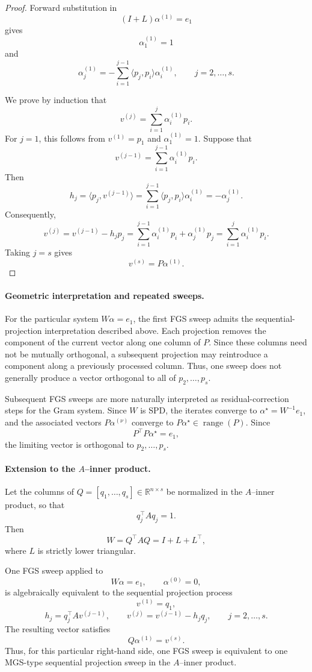 \documentclass[pdflatex,sn-mathphys-num]{sn-jnl}%
\begin{document}
\begin{proof}
Forward substitution in
\[
(I+L)\alpha^{(1)}=e_1
\]
gives
\[
\alpha_1^{(1)}=1
\]
and
\[
\alpha_j^{(1)}
=
-\sum_{i=1}^{j-1}
\langle p_j,p_i\rangle\alpha_i^{(1)},
\qquad
j=2,\dots,s.
\]

We prove by induction that
\[
v^{(j)}
=
\sum_{i=1}^{j}
\alpha_i^{(1)}p_i.
\]
For $j=1$, this follows from
$v^{(1)}=p_1$ and $\alpha_1^{(1)}=1$. Suppose that
\[
v^{(j-1)}
=
\sum_{i=1}^{j-1}
\alpha_i^{(1)}p_i.
\]
Then
\[
h_j
=
\langle p_j,v^{(j-1)}\rangle
=
\sum_{i=1}^{j-1}\langle p_j,p_i\rangle\alpha_i^{(1)}
=
-\alpha_j^{(1)}.
\]
Consequently,
\[
v^{(j)}
=
v^{(j-1)}-h_jp_j
=
\sum_{i=1}^{j-1}\alpha_i^{(1)}p_i+\alpha_j^{(1)}p_j
=
\sum_{i=1}^{j}\alpha_i^{(1)}p_i.
\]
Taking $j=s$ gives
\[
v^{(s)}=P\alpha^{(1)}.
\]
\end{proof}

\paragraph{Geometric interpretation and repeated sweeps.}

For the particular system $W\alpha=e_1$, the first FGS sweep admits
the sequential-projection interpretation described above. Each
projection removes the component of the current vector along one
column of $P$. Since these columns need not be mutually orthogonal, a
subsequent projection may reintroduce a component along a previously
processed column. Thus, one sweep does not generally produce a vector
orthogonal to all of $p_2,\dots,p_s$.

Subsequent FGS sweeps are more naturally interpreted as
residual-correction steps for the Gram system. Since $W$ is SPD, the
iterates converge to $\alpha^\star=W^{-1}e_1$, and the associated
vectors $P\alpha^{(\nu)}$ converge to
$P\alpha^\star\in\operatorname{range}(P)$. Since
\[
P^\top P\alpha^\star=e_1,
\]
the limiting vector is orthogonal to $p_2,\dots,p_s$. 

\paragraph{Extension to the $A$--inner product.}

Let the columns of
$Q=[q_1,\dots,q_s]\in\mathbb{R}^{n\times s}$ be normalized in the
$A$--inner product, so that
\[
q_j^\top A q_j=1.
\]
Then
\[
W=Q^\top A Q=I+L+L^\top,
\]
where $L$ is strictly lower triangular.

One FGS sweep applied to
\[
W\alpha=e_1,
\qquad
\alpha^{(0)}=0,
\]
is algebraically equivalent to the sequential projection process
\[
v^{(1)}=q_1,
\]
\[
h_j=q_j^\top A v^{(j-1)},
\qquad
v^{(j)}=v^{(j-1)}-h_jq_j,
\qquad
j=2,\dots,s.
\]
The resulting vector satisfies
\[
Q\alpha^{(1)}=v^{(s)}.
\]
Thus, for this particular right-hand side, one FGS sweep is
equivalent to one MGS-type sequential projection sweep in the
$A$--inner product.
\end{document}
